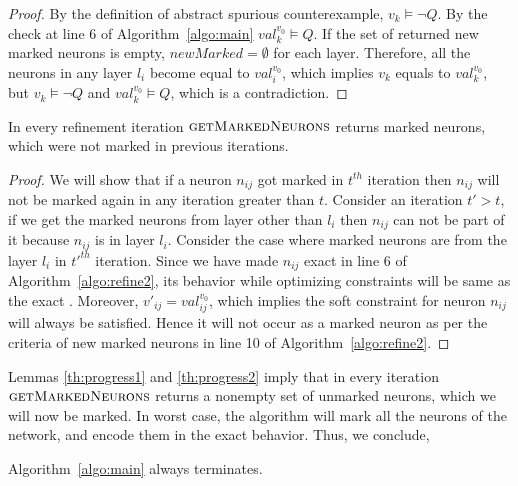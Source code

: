 \begin{proof}
By the definition of abstract spurious counterexample, ${v_k} \models \lnot Q$. 
By the check at line 6 of Algorithm~\ref{algo:main} ${val_k^{{v_0}}} \models Q$. 
If the set of returned new marked neurons is empty, $newMarked = \emptyset$ for each layer. 
Therefore, all the neurons in any layer $l_i$ become equal to ${val_i^{{v_0}}}$,  
which implies ${v_k}$ equals to ${val_k^{{v_0}}}$, but ${v_k} \models \lnot Q$ and 
${val_k^{{v_0}}} \models Q$, which is a contradiction.   
\end{proof}


\begin{lemma}
  \label{th:progress2}
  In every refinement iteration $\textsc{getMarkedNeurons}$
  returns marked neurons, which were not marked in previous iterations. 
\end{lemma}

\begin{proof}
We will show that if a neuron $n_{ij}$ got marked in $t^{th}$ iteration then $n_{ij}$ will not be marked again in any iteration greater than $t$.
Consider an iteration $t' > t$, if we get the marked neurons from layer other
than $l_i$ then $n_{ij}$ can not be part of it because $n_{ij}$ is in layer $l_i$. 
Consider the case where marked neurons are from the layer $l_i$ in $t'^{th}$ iteration. 
Since we have made $n_{ij}$ exact in line 6 of Algorithm~\ref{algo:refine2},
its behavior while optimizing constraints will be same as the exact \relu{}. 
Moreover, $v'_{ij} = val_{ij}^{v_0}$, 
which implies the soft constraint for neuron $n_{ij}$ will always be satisfied. Hence it will not occur as a marked neuron as per the criteria of new marked neurons in line 10 of Algorithm~\ref{algo:refine2}.   %
\end{proof}


Lemmas \ref{th:progress1} and \ref{th:progress2} imply that in every iteration $\textsc{getMarkedNeurons}$ returns a nonempty set of unmarked neurons, which we will now be marked. In worst case, the algorithm will mark all the neurons of the network, and encode them in the exact behavior. Thus, we conclude,

\begin{theorem}
  Algorithm~\ref{algo:main} always terminates.
\end{theorem}


